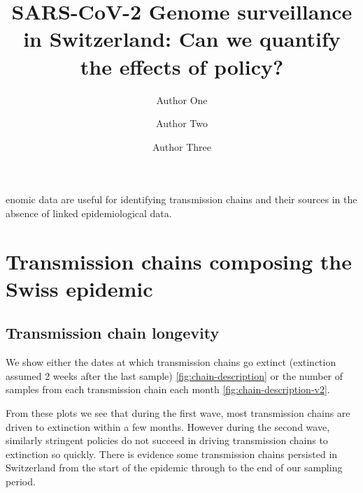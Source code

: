 \documentclass[9pt,twocolumn,twoside,lineno]{pnas-new}
\title{SARS-CoV-2 Genome surveillance in Switzerland: Can we quantify the effects of policy?}
\author[a,c,1]{Author One}
\author[b,1,2]{Author Two}
\author[a]{Author Three}
\affil[a]{Affiliation One}
\affil[b]{Affiliation Two}
\affil[c]{Affiliation Three}
\begin{document}
\maketitle
\thispagestyle{firststyle}

enomic data are useful for identifying transmission chains and their sources in the absence of linked epidemiological data.

\section*{Transmission chains composing the Swiss epidemic}

\subsection{Transmission chain longevity}
We show either the dates at which transmission chains go extinct (extinction assumed 2 weeks after the last sample) \ref{fig:chain-description} or the number of samples from each transmission chain each month \ref{fig:chain-description-v2}.

From these plots we see that during the first wave, most transmission chains are driven to extinction within a few months. However during the second wave, similarly stringent policies do not succeed in driving transmission chains to extinction so quickly. There is evidence some transmission chains persisted in Switzerland from the start of the epidemic through to the end of our sampling period.
\end{document}
